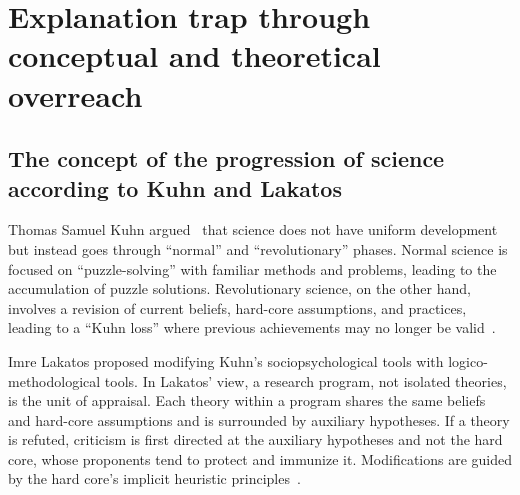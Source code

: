 %
%
%
\chapter{Explanation trap through conceptual and theoretical overreach}
\label{2023-UFO-Appendix-Explanation-Trap} %
\label{2023-UFO-part-Perception-flight-characteristics-to}








\section{The concept of the progression of science according to Kuhn and Lakatos}

Thomas Samuel Kuhn argued~\cite{kuhn} that science does not have uniform development but instead goes through ``normal'' and ``revolutionary'' phases. Normal science is focused on ``puzzle-solving'' with familiar methods and problems, leading to the accumulation of puzzle solutions. Revolutionary science, on the other hand, involves a revision of current beliefs, hard-core assumptions, and practices, leading to a ``Kuhn loss'' where previous achievements may no longer be valid~\cite{sep-thomas-kuhn}.

Imre Lakatos proposed modifying Kuhn's sociopsychological tools with logico-methodological tools. In Lakatos' view, a research program, not isolated theories, is the unit of appraisal. Each theory within a program shares the same beliefs and hard-core assumptions and is surrounded by auxiliary hypotheses. If a theory is refuted, criticism is first directed at the auxiliary hypotheses and not the hard core, whose proponents tend to protect and immunize it. Modifications are guided by the hard core's implicit heuristic principles~\cite{sep-lakatos}.

